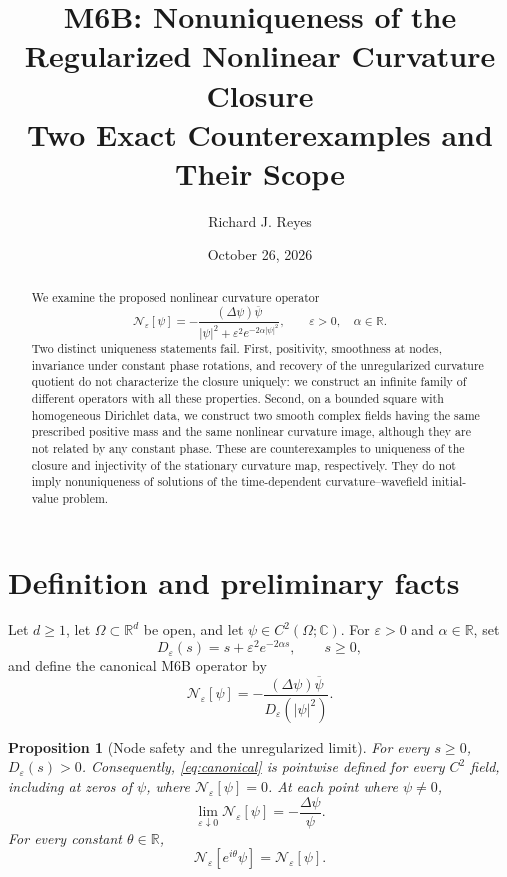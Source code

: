 \documentclass[11pt]{article}
\title{M6B: Nonuniqueness of the Regularized Nonlinear Curvature Closure\\
\large Two Exact Counterexamples and Their Scope}
\author{Richard J. Reyes}
\date{October 26, 2026}
\newtheorem{proposition}[theorem]{Proposition}
\theoremstyle{remark}
\newcommand{\Ncurv}{\mathcal{N}_{\varepsilon}}
\newcommand{\R}{\mathbb{R}}
\newcommand{\C}{\mathbb{C}}
\begin{document}
\maketitle

\begin{abstract}
We examine the proposed nonlinear curvature operator
\[
\mathcal{N}_{\varepsilon}[\psi]
=-\frac{(\Delta\psi)\overline{\psi}}
       {|\psi|^2+\varepsilon^2e^{-2\alpha|\psi|^2}},
\qquad \varepsilon>0,\quad\alpha\in\R.
\]
Two distinct uniqueness statements fail. First, positivity, smoothness at
nodes, invariance under constant phase rotations, and recovery of the
unregularized curvature quotient do not characterize the closure uniquely:
we construct an infinite family of different operators with all these
properties. Second, on a bounded square with homogeneous Dirichlet data,
we construct two smooth complex fields having the same prescribed positive
mass and the same nonlinear curvature image, although they are not related
by any constant phase. These are counterexamples to uniqueness of the
closure and injectivity of the stationary curvature map, respectively.
They do not imply nonuniqueness of solutions of the time-dependent
curvature--wavefield initial-value problem.
\end{abstract}

\section{Definition and preliminary facts}

Let $d\geq1$, let $\Omega\subset\R^d$ be open, and let
$\psi\in C^2(\Omega;\C)$. For $\varepsilon>0$ and $\alpha\in\R$, set
\begin{equation}\label{eq:denominator}
D_\varepsilon(s)=s+\varepsilon^2e^{-2\alpha s},
\qquad s\geq0,
\end{equation}
and define the canonical M6B operator by
\begin{equation}\label{eq:canonical}
\boxed{\quad
\Ncurv[\psi]
=-\frac{(\Delta\psi)\overline\psi}
       {D_\varepsilon(|\psi|^2)}.
\quad}
\end{equation}

\begin{proposition}[Node safety and the unregularized limit]
\label{prop:basic}
For every $s\geq0$, $D_\varepsilon(s)>0$. Consequently,
\eqref{eq:canonical} is pointwise defined for every $C^2$ field, including
at zeros of $\psi$, where $\Ncurv[\psi]=0$. At each point where
$\psi\neq0$,
\begin{equation}\label{eq:unreg}
\lim_{\varepsilon\downarrow0}\Ncurv[\psi]
=-\frac{\Delta\psi}{\psi}.
\end{equation}
For every constant $\theta\in\R$,
\begin{equation}\label{eq:invariance}
\Ncurv[e^{i\theta}\psi]=\Ncurv[\psi].
\end{equation}
\end{proposition}
\end{document}
